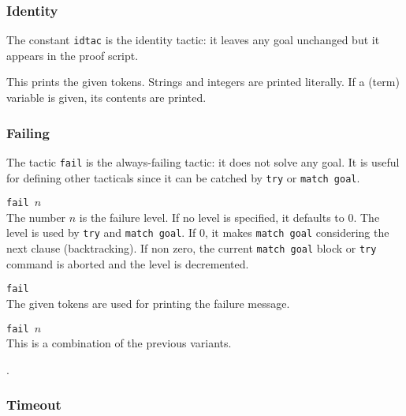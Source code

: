\ErrMsg {}

\subsubsection[Identity]{Identity
}

The constant {\tt idtac} is the identity tactic: it leaves any goal
unchanged but it appears in the proof script.


This prints the given tokens. Strings and integers are printed
literally. If a (term) variable is given, its contents are printed.


\subsubsection[Failing]{Failing
}

The tactic {\tt fail} is the always-failing tactic: it does not solve
any goal. It is useful for defining other tacticals since it can be
catched by {\tt try} or {\tt match goal}. 

\begin{Variants}
\item {\tt fail $n$}\\
The number $n$ is the failure level. If no level is specified, it
defaults to $0$.  The level is used by {\tt try} and {\tt match goal}.
If $0$, it makes {\tt match goal} considering the next clause
(backtracking). If non zero, the current {\tt match goal} block or
{\tt try} command is aborted and the level is decremented.

\item {\tt fail \nelist{\messagetoken}{}}\\
The given tokens are used for printing the failure message.

\item {\tt fail $n$ \nelist{\messagetoken}{}}\\
This is a combination of the previous variants.
\end{Variants}

\ErrMsg {}.

\subsubsection[Timeout]{Timeout
}

